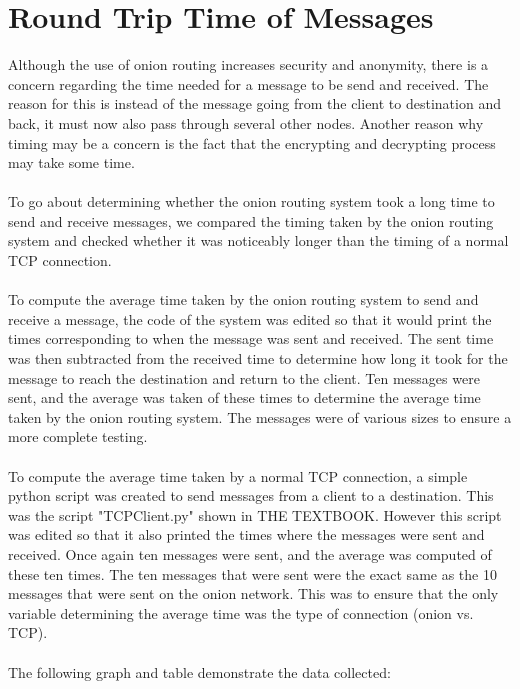 \documentclass[10pt]{report}
\begin{document}
\section{Round Trip Time of Messages}
Although the use of onion routing increases security and anonymity, there is a concern regarding the time needed for a message to be send and received. The reason for this is instead of the message going from the client to destination and back, it must now also pass through several other nodes. Another reason why timing may be a concern is the fact that the encrypting and decrypting process may take some time.\\\\
To go about determining whether the onion routing system took a long time to send and receive messages, we compared the timing taken by the onion routing system and checked whether it was noticeably longer than the timing of a normal TCP connection.\\\\
To compute the average time taken by the onion routing system to send and receive a message, the code of the system was edited so that it would print the times corresponding to when the message was sent and received. The sent time was then subtracted from the received time to determine how long it took for the message to reach the destination and return to the client. Ten messages were sent, and the average was taken of these times to determine the average time taken by the onion routing system. The messages were of various sizes to ensure a more complete testing.\\\\
To compute the average time taken by a normal TCP connection, a simple python script was created to send messages from a client to a destination. This was the script "TCPClient.py" shown in THE TEXTBOOK. However this script was edited so that it also printed the times where the messages were sent and received. Once again ten messages were sent, and the average was computed of these ten times. The ten messages that were sent were the exact same as the 10 messages that were sent on the onion network. This was to ensure that the only variable determining the average time was the type of connection (onion vs. TCP).\\\\
The following graph and table demonstrate the data collected:
\end{document}
